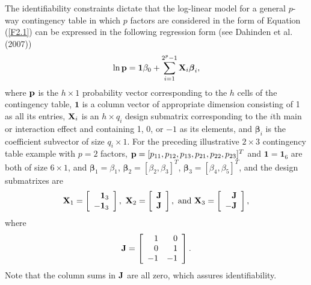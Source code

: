 The identifiability constraints dictate that the log-linear model for a general
$p$-way contingency table in which $p$ factors are considered in the form of
Equation (\ref{F2.1}) can be expressed in the following regression form (see
Dahinden et al. (2007))
\begin{equation}
\ln {\bf p}=\bm 1\beta_0+\sum_{i=1}^{2^p-1}{\bf X}_i\bm{\beta}_i,\label{F2.2}
\end{equation}
where ${\bf p}$ is the $h\times 1$ probability vector corresponding to the $h$ cells
of the contingency table, $\bm{1}$ is a column vector of appropriate dimension
consisting of 1 as all its entries, ${\bf X}_i$ is an $h\times q_i$ design submatrix
corresponding to the $i$th main or interaction effect and containing 1, 0, or $-1$
as its elements, and $\bm{\beta}_i$ is the coefficient subvector of size $q_i\times
1$. For the preceding illustrative $2\times 3$ contingency table example with $p=2$
factors, ${\bf p}=[p_{11},p_{12},p_{13},p_{21},p_{22},p_{23}]^T$ and $\bm 1=\bm 1_6$
are both of size $6\times 1$, and $\bm\beta_1=\beta_1$,
$\bm\beta_2=[\beta_2,\beta_3]^T$, $\bm\beta_3=[\beta_4,\beta_5]^T$, and the design
submatrixes are
\[
{\bf X}_1=\left[\begin{array}{r}\bm 1_3\\-\bm 1_3\end{array}\right],\ {\bf
X}_2=\left[\begin{array}{r}{\bf J}\\{\bf J}\end{array}\right],\ \mathrm{and}\ {\bf
X}_3=\left[\begin{array}{r}{\bf J}\\-{\bf J}\end{array}\right],
\]
where
\[
{\bf J}=\left[\begin{array}{rr}1&0\\0&1\\-1&-1\end{array}\right].
\]
Note that the column sums in ${\bf J}$ are all zero, which assures identifiability.

